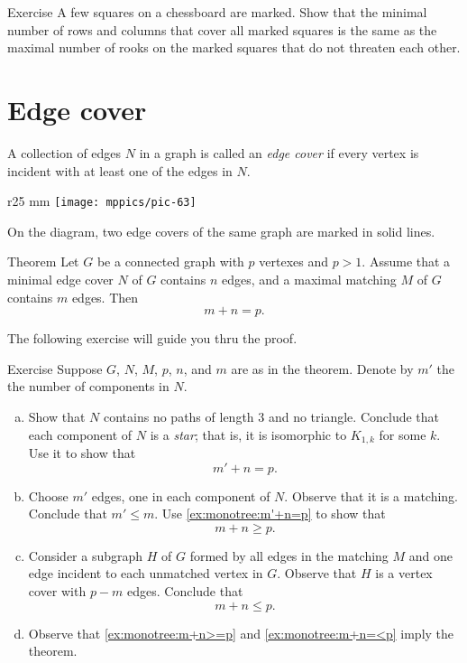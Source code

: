 \begin{thm}{Exercise}
A few squares
 on a chessboard are marked.
Show that the minimal number of rows and columns that cover all marked squares is the same as the maximal number of rooks on the marked squares that do not threaten each other.
\end{thm}

\section*{Edge cover}

A collection of edges $N$ in a graph is called an \emph{edge cover} if every vertex is incident with at least one of the edges in $N$.

\begin{wrapfigure}{r}{25 mm}
\vskip-2mm
\centering
\texttt{[image: mppics/pic-63]}
\vskip0mm
\end{wrapfigure}

On the diagram, two edge covers of the same graph are marked in solid lines.

\begin{thm}{Theorem}
Let $G$ be a connected graph with $p$ vertexes and $p>1$.
Assume that a minimal edge cover $N$ of $G$ contains $n$ edges, and a maximal matching $M$ of $G$ contains $m$ edges.
Then
\[m+n=p.\]
\end{thm}

The following exercise will guide you thru the proof.


\begin{thm}{Exercise}\label{ex:monotree}
Suppose $G$, $N$, $M$, $p$, $n$, and $m$ are as in the theorem.
Denote by $m'$ the  the number of components in $N$.
\begin{enumerate}[(a)]
\item\label{ex:monotree:m'+n=p} Show that $N$ contains no paths of length 3 and no triangle.
Conclude that each component of $N$ is a \emph{star};
that is, it is isomorphic to $K_{1,k}$ for some $k$.
Use it to show that 
\[m'+n=p.\]
\item\label{ex:monotree:m+n>=p} Choose $m'$ edges, one in each component of $N$.
Observe that it is a matching.
Conclude that $m'\le m$.
Use \ref{ex:monotree:m'+n=p} to show that 
\[m+n\ge p.\]
\item\label{ex:monotree:m+n=<p} Consider a subgraph $H$ of $G$ formed by all edges in the matching $M$ and one edge incident to each unmatched vertex in $G$.
Observe that $H$ is a vertex cover with $p-m$ edges. 
Conclude that 
\[m+n\le p.\]
\item Observe that \ref{ex:monotree:m+n>=p} and \ref{ex:monotree:m+n=<p} imply the theorem.
\end{enumerate}

\end{thm}


